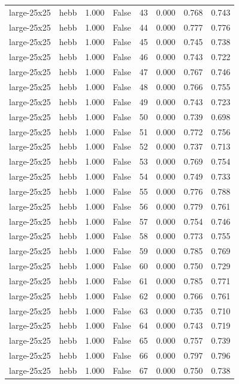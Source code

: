\begin{tabular}{llrrrrrr}
large-25x25 & hebb & 1.000 & False & 43 & 0.000 & 0.768 & 0.743 \\
large-25x25 & hebb & 1.000 & False & 44 & 0.000 & 0.777 & 0.776 \\
large-25x25 & hebb & 1.000 & False & 45 & 0.000 & 0.745 & 0.738 \\
large-25x25 & hebb & 1.000 & False & 46 & 0.000 & 0.743 & 0.722 \\
large-25x25 & hebb & 1.000 & False & 47 & 0.000 & 0.767 & 0.746 \\
large-25x25 & hebb & 1.000 & False & 48 & 0.000 & 0.766 & 0.755 \\
large-25x25 & hebb & 1.000 & False & 49 & 0.000 & 0.743 & 0.723 \\
large-25x25 & hebb & 1.000 & False & 50 & 0.000 & 0.739 & 0.698 \\
large-25x25 & hebb & 1.000 & False & 51 & 0.000 & 0.772 & 0.756 \\
large-25x25 & hebb & 1.000 & False & 52 & 0.000 & 0.737 & 0.713 \\
large-25x25 & hebb & 1.000 & False & 53 & 0.000 & 0.769 & 0.754 \\
large-25x25 & hebb & 1.000 & False & 54 & 0.000 & 0.749 & 0.733 \\
large-25x25 & hebb & 1.000 & False & 55 & 0.000 & 0.776 & 0.788 \\
large-25x25 & hebb & 1.000 & False & 56 & 0.000 & 0.779 & 0.761 \\
large-25x25 & hebb & 1.000 & False & 57 & 0.000 & 0.754 & 0.746 \\
large-25x25 & hebb & 1.000 & False & 58 & 0.000 & 0.773 & 0.755 \\
large-25x25 & hebb & 1.000 & False & 59 & 0.000 & 0.785 & 0.769 \\
large-25x25 & hebb & 1.000 & False & 60 & 0.000 & 0.750 & 0.729 \\
large-25x25 & hebb & 1.000 & False & 61 & 0.000 & 0.785 & 0.771 \\
large-25x25 & hebb & 1.000 & False & 62 & 0.000 & 0.766 & 0.761 \\
large-25x25 & hebb & 1.000 & False & 63 & 0.000 & 0.735 & 0.710 \\
large-25x25 & hebb & 1.000 & False & 64 & 0.000 & 0.743 & 0.719 \\
large-25x25 & hebb & 1.000 & False & 65 & 0.000 & 0.757 & 0.739 \\
large-25x25 & hebb & 1.000 & False & 66 & 0.000 & 0.797 & 0.796 \\
large-25x25 & hebb & 1.000 & False & 67 & 0.000 & 0.750 & 0.738 \\

\end{tabular}

